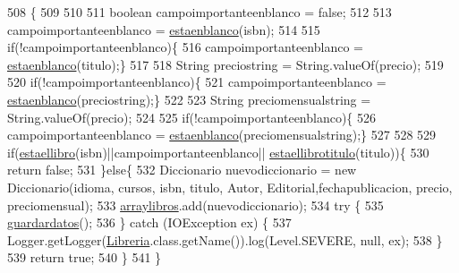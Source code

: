 \begin{DoxyCode}
508                                                                                                            
                     \{
509              
510          
511           \textcolor{keywordtype}{boolean} campoimportanteenblanco = \textcolor{keyword}{false};
512              
513              campoimportanteenblanco = \mbox{\hyperlink{classlibreria_1_1_libreria_afca98a0ea16507ff5cc9bc0dde706abb}{estaenblanco}}(isbn);
514              
515              \textcolor{keywordflow}{if}(!campoimportanteenblanco)\{
516              campoimportanteenblanco = \mbox{\hyperlink{classlibreria_1_1_libreria_afca98a0ea16507ff5cc9bc0dde706abb}{estaenblanco}}(titulo);\}
517              
518              String preciostring = String.valueOf(precio);
519              
520              \textcolor{keywordflow}{if}(!campoimportanteenblanco)\{
521              campoimportanteenblanco = \mbox{\hyperlink{classlibreria_1_1_libreria_afca98a0ea16507ff5cc9bc0dde706abb}{estaenblanco}}(preciostring);\}
522              
523              String preciomensualstring = String.valueOf(precio);
524              
525              \textcolor{keywordflow}{if}(!campoimportanteenblanco)\{
526              campoimportanteenblanco = \mbox{\hyperlink{classlibreria_1_1_libreria_afca98a0ea16507ff5cc9bc0dde706abb}{estaenblanco}}(preciomensualstring);\}
527              
528          
529             \textcolor{keywordflow}{if}(\mbox{\hyperlink{classlibreria_1_1_libreria_a0af77d7fa2b6f3c0a0b218ee9df08ce3}{estaellibro}}(isbn)||campoimportanteenblanco||
      \mbox{\hyperlink{classlibreria_1_1_libreria_aec6380fd1bcff89fb0f2d6d4b4584598}{estaellibrotitulo}}(titulo))\{
530                 \textcolor{keywordflow}{return} \textcolor{keyword}{false};
531             \}\textcolor{keywordflow}{else}\{
532                 Diccionario nuevodiccionario = \textcolor{keyword}{new} Diccionario(idioma, cursos, isbn, titulo, Autor, 
      Editorial,fechapublicacion, precio, preciomensual);
533                 \mbox{\hyperlink{classlibreria_1_1_libreria_aa55c2bad2db92eb94ea1ba9c6997f47d}{arraylibros}}.add(nuevodiccionario);
534               \textcolor{keywordflow}{try} \{
535                   \mbox{\hyperlink{classlibreria_1_1_libreria_abc10249e70e74a9ba55a081bbf23cfcd}{guardardatos}}();
536               \} \textcolor{keywordflow}{catch} (IOException ex) \{
537                   Logger.getLogger(\mbox{\hyperlink{classlibreria_1_1_libreria_a93220dd4de47ee3b7ef4b2a90701c253}{Libreria}}.class.getName()).log(Level.SEVERE, null, ex);
538               \}
539                 \textcolor{keywordflow}{return} \textcolor{keyword}{true};
540             \}
541      \}
\end{DoxyCode}
\mbox{\label{classlibreria_1_1_libreria_a5582b1ac3c3a9cd393a92128c2f77dce}} 
